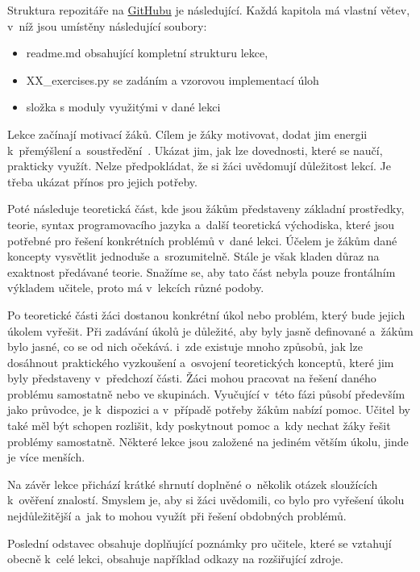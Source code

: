 \documentclass[
  digital,     %
  oneside,     %
  nosansbold,  %
  colorbold, %
  lof,         %
  nolot,         %
]{fithesis4}
\begin{document}
Struktura repozitáře na \href{https://github.com/denisa-mat/BP-microbit}{GitHubu} je následující. Každá kapitola má vlastní větev, v~níž jsou umístěny následující soubory:
\vspace{0,1cm}
\begin{itemize}
    \item readme.md obsahující kompletní strukturu lekce,
    \item XX\_exercises.py se zadáním a vzorovou implementací úloh
    \item složka s moduly využitými v dané lekci
\end{itemize}
\vspace{0,1cm}
Lekce začínají motivací žáků. Cílem je žáky motivovat, dodat jim energii k~přemýšlení a~soustředění~\cite{Filgona20}. Ukázat jim, jak lze dovednosti, které se naučí, prakticky využít. Nelze předpokládat, že si žáci uvědomují důležitost lekcí. Je třeba ukázat přínos pro jejich potřeby.

Poté následuje teoretická část, kde jsou žákům představeny základní prostředky, teorie, syntax programovacího jazyka a~další teoretická východiska, které jsou potřebné pro řešení konkrétních problémů v~dané lekci. Účelem je žákům dané koncepty vysvětlit jednoduše a~srozumitelně. Stále je však kladen důraz na exaktnost předávané teorie. Snažíme se, aby tato část nebyla pouze frontálním výkladem učitele, proto má v~lekcích různé podoby. 

Po teoretické části žáci dostanou konkrétní úkol nebo problém, který bude jejich úkolem vyřešit. Při zadávání úkolů je důležité, aby byly jasně definované a~žákům bylo jasné, co se od nich očekává.  i~zde existuje mnoho způsobů, jak lze dosáhnout praktického vyzkoušení a~osvojení teoretických konceptů, které jim byly představeny v~předchozí části. Žáci mohou pracovat na řešení daného problému samostatně nebo ve skupinách. Vyučující v~této fázi působí především jako průvodce, je k~dispozici a v~případě potřeby žákům nabízí pomoc. Učitel by také měl být schopen rozlišit, kdy poskytnout pomoc a~kdy nechat žáky řešit problémy samostatně. Některé lekce jsou založené na jediném větším úkolu, jinde je více menších.

Na závěr lekce přichází krátké shrnutí doplněné o~několik otázek sloužících k~ověření znalostí. Smyslem je, aby si žáci uvědomili, co bylo pro vyřešení úkolu nejdůležitější a~jak to mohou využít při řešení obdobných problémů.

Poslední odstavec obsahuje doplňující poznámky pro učitele, které se vztahují obecně k~celé lekci, obsahuje například odkazy na rozšiřující zdroje.  %
\end{document}
